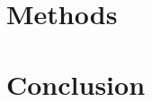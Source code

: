 \documentclass[12pt]{article}
\begin{document}

\section{Methods}






\section{Conclusion}


\newpage
 


\end{document}
